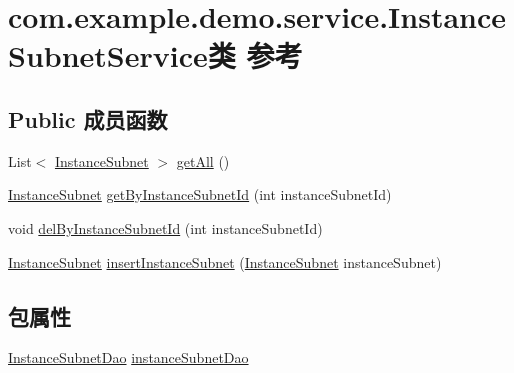 \hypertarget{classcom_1_1example_1_1demo_1_1service_1_1_instance_subnet_service}{}\section{com.\+example.\+demo.\+service.\+Instance\+Subnet\+Service类 参考}
\label{classcom_1_1example_1_1demo_1_1service_1_1_instance_subnet_service}
\subsection*{Public 成员函数}
\begin{DoxyCompactItemize}
\item 
List$<$ \mbox{\hyperlink{classcom_1_1example_1_1demo_1_1modular_1_1_instance_subnet}{Instance\+Subnet}} $>$ \mbox{\hyperlink{classcom_1_1example_1_1demo_1_1service_1_1_instance_subnet_service_a43f3bf6546e57248f51d578f2cc8e543}{get\+All}} ()
\item 
\mbox{\hyperlink{classcom_1_1example_1_1demo_1_1modular_1_1_instance_subnet}{Instance\+Subnet}} \mbox{\hyperlink{classcom_1_1example_1_1demo_1_1service_1_1_instance_subnet_service_a8471b31b8d747a0f2bfd82c5efadb08a}{get\+By\+Instance\+Subnet\+Id}} (int instance\+Subnet\+Id)
\item 
void \mbox{\hyperlink{classcom_1_1example_1_1demo_1_1service_1_1_instance_subnet_service_ab6064e7ee32e16abce47561024cb0076}{del\+By\+Instance\+Subnet\+Id}} (int instance\+Subnet\+Id)
\item 
\mbox{\hyperlink{classcom_1_1example_1_1demo_1_1modular_1_1_instance_subnet}{Instance\+Subnet}} \mbox{\hyperlink{classcom_1_1example_1_1demo_1_1service_1_1_instance_subnet_service_a077d35b530da82516a16d417bf38269b}{insert\+Instance\+Subnet}} (\mbox{\hyperlink{classcom_1_1example_1_1demo_1_1modular_1_1_instance_subnet}{Instance\+Subnet}} instance\+Subnet)
\end{DoxyCompactItemize}
\subsection*{包属性}
\begin{DoxyCompactItemize}
\item 
\mbox{\hyperlink{interfacecom_1_1example_1_1demo_1_1dao_1_1_instance_subnet_dao}{Instance\+Subnet\+Dao}} \mbox{\hyperlink{classcom_1_1example_1_1demo_1_1service_1_1_instance_subnet_service_af6bf932c65f38e1464c70886618d9796}{instance\+Subnet\+Dao}}
\end{DoxyCompactItemize}


